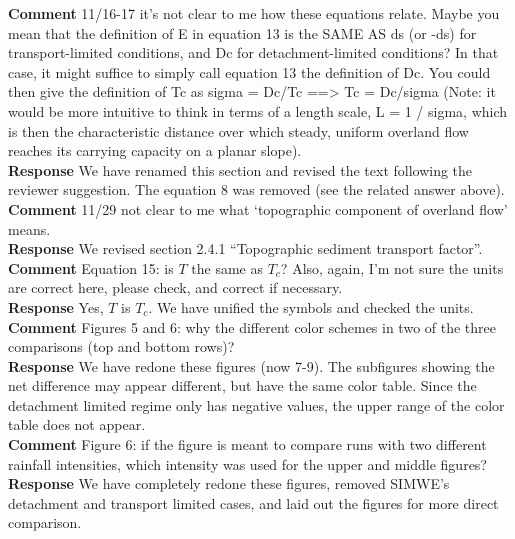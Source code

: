 \documentclass[gmd, manuscript]{copernicus}
\begin{document}
\noindent\textbf{Comment}
11/16-17 it's not clear to me how these equations relate. Maybe you mean that the definition of E in equation 13 is the SAME AS ds (or -ds) for transport-limited conditions, and Dc for detachment-limited conditions? In that case, it might suffice to simply call equation 13 the definition of Dc. You could then give the definition of Tc as sigma = Dc/Tc ==> Tc = Dc/sigma (Note: it would be more intuitive to think in terms of a length scale, L = 1 / sigma, which is then the characteristic distance over which steady, uniform overland flow reaches its carrying capacity on a planar slope).
\\

\noindent\textbf{Response}
We have renamed this section and revised the text following the reviewer suggestion. The equation 8 was removed (see the related answer above).
\\

\noindent\textbf{Comment}
11/29 not clear to me what `topographic component of overland flow' means.
\\

\noindent\textbf{Response}
We revised section 2.4.1 ``Topographic sediment transport factor''.
\\

\noindent\textbf{Comment}
Equation 15: is $T$ the same as $T_c$? Also, again, I’m not sure the units are correct here, please check, and correct if necessary.
\\

\noindent\textbf{Response}
Yes, $T$ is $T_c$. We have unified the symbols and checked the units. \\

\noindent\textbf{Comment}
Figures 5 and 6: why the different color schemes in two of the three comparisons (top and bottom rows)?
\\

\noindent\textbf{Response}
We have redone these figures (now 7-9). The subfigures showing the net difference may appear different, but have the same color table. Since the detachment limited regime only has negative values, the upper range of the color table does not appear.\\

\noindent\textbf{Comment}
Figure 6: if the figure is meant to compare runs with two different rainfall intensities, which intensity was used for the upper and middle figures? 
\\

\noindent\textbf{Response}
We have completely redone these figures, removed SIMWE’s detachment and transport limited cases, and laid out the figures for more direct comparison. 
\\
\end{document}
